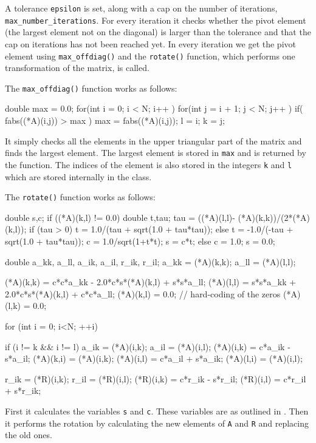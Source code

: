 \documentclass[reprint,english,notitlepage]{revtex4-1}  %
\begin{document}
A tolerance \verb+epsilon+ is set, along with a cap on the number of iterations, \verb+max_number_iterations+. For every iteration it checks whether the pivot element (the largest element not on the diagonal) is larger than the tolerance and that the cap on iterations has not been reached yet. In every iteration we get the pivot element using \verb+max_offdiag()+ and the \verb+rotate()+ function, which performs one transformation of the matrix, is called. 

The \verb+max_offdiag()+ function works as follows:

\begin{cpp}
double max = 0.0;
for(int i = 0; i < N; i++ ){
  for(int j = i + 1; j < N; j++ ){
    if( fabs((*A)(i,j)) > max ){
      max = fabs((*A)(i,j));
      l = i;
      k = j;
    }
  }
}
\end{cpp}

It simply checks all the elements in the upper triangular part of the matrix and finds the largest element. The largest element is stored in \verb+max+ and is returned by the function. The indices of the element is also stored in the integers \verb+k+ and \verb+l+ which are stored internally in the class.

The \verb+rotate()+ function works as follows:

\begin{cpp}
double s,c;
if ((*A)(k,l) != 0.0){
  double t,tau;
  tau = ((*A)(l,l)- (*A)(k,k))/(2*(*A)(k,l));
  if (tau > 0){
    t = 1.0/(tau + sqrt(1.0 + tau*tau));
  }
  else {
    t = -1.0/(-tau + sqrt(1.0 + tau*tau));
  }
  c = 1.0/sqrt(1+t*t);
  s = c*t;
}
else {
  c = 1.0;
  s = 0.0;
}

double a_kk, a_ll, a_ik, a_il, r_ik, r_il;
a_kk = (*A)(k,k);
a_ll = (*A)(l,l);

(*A)(k,k) = c*c*a_kk - 2.0*c*s*(*A)(k,l) + s*s*a_ll;
(*A)(l,l) = s*s*a_kk + 2.0*c*s*(*A)(k,l) + c*c*a_ll;
(*A)(k,l) = 0.0; // hard-coding of the zeros
(*A)(l,k) = 0.0;

for (int i = 0; i<N; ++i){
  if (i != k && i != l) {
    a_ik = (*A)(i,k);
    a_il = (*A)(i,l);
    (*A)(i,k) = c*a_ik - s*a_il;
    (*A)(k,i) = (*A)(i,k);
    (*A)(i,l) = c*a_il + s*a_ik;
    (*A)(l,i) = (*A)(i,l);
  }

  r_ik = (*R)(i,k);
  r_il = (*R)(i,l);
  (*R)(i,k) = c*r_ik - s*r_il;
  (*R)(i,l) = c*r_il + s*r_ik;
}
\end{cpp}

First it calculates the variables \verb+s+ and \verb+c+. These variables are as outlined in \citep{Hjorth-Jensen2015}. Then it performs the rotation by calculating the new elements of \verb+A+ and \verb+R+ and replacing the old ones.
\end{document}
